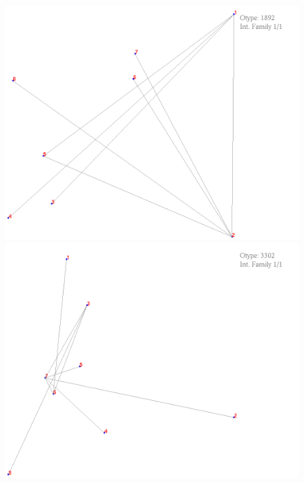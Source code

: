\documentclass[11pt,epsf,times,letterpaper]{article}
\begin{document}
	\begin{figure}
		\includegraphics[scale=.4]{if_tam0_tam1/15.png}
		\includegraphics[scale=.4]{if_tam0_tam1/16.png}
	\end{figure}
	
\end{document}
